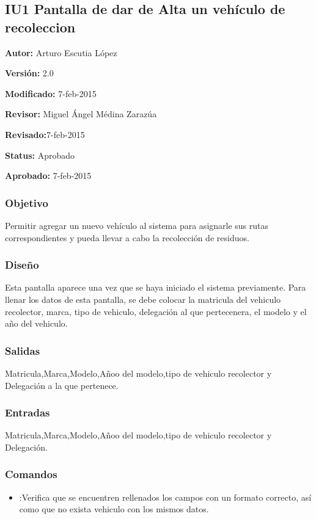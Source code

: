 \subsection{IU1 Pantalla de dar de Alta un vehículo de recoleccion}

\begin{objetivos}
	\item {\bf Autor:} Arturo Escutia López
	\item {\bf Versión:} 2.0
	\item {\bf Modificado:} 7-feb-2015
	\item {\bf Revisor:} Miguel Ángel Médina Zarazúa
	\item {\bf Revisado:}7-feb-2015
	\item {\bf Status:} Aprobado
	\item {\bf Aprobado:} 7-feb-2015
\end{objetivos}

\subsubsection{Objetivo}
Permitir agregar un nuevo vehículo al sistema para asignarle sus rutas correspondientes y pueda llevar a cabo la recolección de residuos.

\subsubsection{Diseño}
	Esta pantalla aparece una vez que se haya iniciado el sistema previamente.
	Para llenar los datos de esta pantalla, se debe colocar la matricula del vehiculo recolector, marca, tipo de vehiculo, delegación al que pertecenera, el modelo y el año del vehiculo.
	


\subsubsection{Salidas}
Matricula,Marca,Modelo,Añoo del modelo,tipo de vehiculo recolector y Delegación a la que pertenece.

\subsubsection{Entradas}
Matricula,Marca,Modelo,Añoo del modelo,tipo de vehiculo recolector y Delegación.

\subsubsection{Comandos}
\begin{itemize}
	\item {}:Verifica que se encuentren rellenados los campos con un formato correcto, así como que no exista vehiculo con los mismos datos.
\end{itemize}

